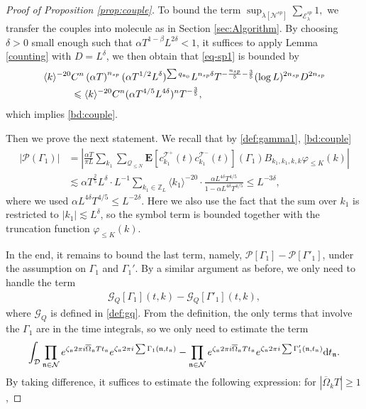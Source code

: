 \documentclass[UTF-8,reqno]{amsart}
\numberwithin{equation}{section}
\theoremstyle{definition}
\def\dif{{\mathord{{\rm d}}}}
\def\geq{\geqslant}
\def\leq{\leqslant}
\def\dif{{\mathord{{\rm d}}}}
\def\geq{\geqslant}
\def\leq{\leqslant}
\begin{document}
\begin{proof}[Proof of Proposition \ref{prop:couple}]
    To bound the  term 
      $  \sup_{\lambda[\mathcal N^{{sp}}]}\sum_{\mathcal E_{\lambda }^{{sp}}}%
     1 ,$
    we transfer the couples into molecule as in Section \ref{sec:Algorithm}.  By choosing $\delta>0$ small enough such that $\alpha T^{1-\beta}L^{2\delta}<1$, it suffices to apply Lemma \ref{counting} with $D=L^{\delta}$, we then obtain that \eqref{eq-sp1} is bounded by
    \begin{align}
     \langle k\rangle^{-20} &C^{n}\left( \alpha T \right)^{n_{{{sp}}}}(\alpha  T^{1/2}L^\delta )^{\sum q_{\mathfrak{n}_0}}L^{n_{sp}\delta}T^{-\frac{n_{sp}}{5} - \frac{3}{5}}  (\log L)^{2n_{sp}}D^{2n_{sp}}\notag\\
     &\leq  \langle k\rangle^{-20} C^{n}(\alpha  T^{4/5} L^{4\delta})^nT^{- \frac{3}{5}},\notag
    \end{align}
    which implies \eqref{bd:couple}.
     
   Then we prove the next statement.  We recall that by \eqref{def:gamma1}, \eqref{bd:couple}
 \begin{align*}
   | \mathscr{P}( \Gamma_1)|&=\left|\frac{\alpha T}{\pi L}\sum_{k_1}\sum_{\mathcal{Q}_{\leq N}}\mathbf{E}[ c^{\mathcal{T}^+}_{k_1} (t)c^{\mathcal{T}^-}_{k_1}(t)] ( \Gamma_1)B_{k_1,k_1,k,k}\varphi_{\leq K}(k)\right|\\
   &\lesssim \alpha T^{\frac25}L^\delta \cdot L^{-1}\sum_{k_1\in\mathbb{Z}_L}\langle k_1\rangle^{-20} \cdot \frac{\alpha L^{4\delta}  T^{4/5}}{1-\alpha L^{4\delta} T^{4/5}} \leq L^{-3\delta},
 \end{align*}
 where we used $\alpha L^{4\delta} T^{4/5}\leq L^{-2\delta}$.  Here we also use the fact that the sum over $k_1$ is restricted to $|k_1| \lesssim L^\delta$, so the symbol term is bounded together with the
  truncation function $\varphi_{\leq K}(k)$.



In the end,   it remains to  bound the last term, namely,  $\mathscr{P}[\Gamma_1]-\mathscr{P}[{\Gamma}'_1]$, under the assumption on $\Gamma_1$ and $\Gamma_1'$. By a similar argument as before, we only need to handle the term 
\begin{align*}
    \mathcal{G}_Q[\Gamma_1](t,k)-    \mathcal{G}_Q[{\Gamma}'_1](t,k),
\end{align*}
 where $ \mathcal{G}_Q$ is defined in \eqref{def:gq}. From the definition, the only terms that involve the  $\Gamma_1$  are in the time integrals, so we
 only need to estimate the term 
 \begin{align}
    \int_{\mathcal{D}}\prod_{\mathfrak{n}\in\mathcal{N}}  e^{\zeta_\mathfrak{n}2\pi i\overline\Omega_\mathfrak{n}Tt_\mathfrak{n}}e^{\zeta_\mathfrak{n}2\pi i\sum\Gamma_1(\mathfrak{n},t_\mathfrak{n}) }-\prod_{\mathfrak{n}\in\mathcal{N}}  e^{\zeta_\mathfrak{n}2\pi i\overline\Omega_\mathfrak{n}Tt_\mathfrak{n}}e^{\zeta_\mathfrak{n}2\pi i\sum\Gamma'_1(\mathfrak{n},t_\mathfrak{n}) } \dif t_\mathfrak{n}.\label{bd:inge_diff}
 \end{align}
  By taking difference, it suffices to estimate the following expression: for $|\overline\Omega_kT|\geq 1$,
 

\end{proof}
\end{document}
